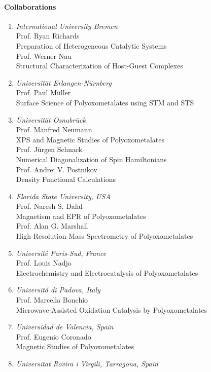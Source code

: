 \paragraph{Collaborations}
\begin{enumerate}
\item {\sl International University Bremen}\\ Prof. Ryan Richards\\
  Preparation of Heterogeneous Catalytic Systems\\
  Prof. Werner Nau\\
  Structural Characterization of Host-Guest Complexes
\item{\sl Universit\"at Erlangen-N\"urnberg} \\ Prof. Paul M\"uller \\
  Surface Science of Polyoxometalates using STM and STS
\item {\sl Universit\"at Osnabr\"uck}\\ Prof. Manfred Neumann\\
  XPS and Magnetic Studies of Polyoxometalates\\
  Prof. J\"urgen Schnack \\ Numerical Diagonalization of Spin
  Hamiltonians\\
  Prof. Andrei V. Postnikov\\
  Density Functional Calculations
\item {\sl Florida State University, USA} \\ Prof. Naresh S. Dalal \\Magnetism and EPR of
  Polyoxometalates
  \\Prof. Alan G. Marshall\\
  High Resolution Mass Spectrometry of Polyoxometalates
\item {\sl Universit\'{e} Paris-Sud, France} \\ Prof. Louis Nadjo\\
  Electrochemistry and Electrocatalysis of Polyoxometalates
\item {\sl Universit\'{a} di Padova, Italy}\\ Prof. Marcella Bonchio\\Microwave-Assisted
  Oxidation Catalysis by Polyoxometalates
\item {\sl Universidad de Valencia, Spain} \\ Prof. Eugenio Coronado \\ Magnetic Studies
  of Polyoxometalates
\item {\sl Universitat Rovira i Virgili, Tarragona, Spain}\\

\end{enumerate}
